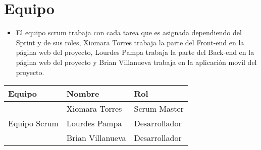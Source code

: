 \chapter{Equipo}
\begin{itemize}
	\item El equipo scrum trabaja con cada tarea que es asignada dependiendo del Sprint y de sus roles, Xiomara Torres trabaja la parte del Front-end en la página web del proyecto, Lourdes Pampa trabaja la parte del Back-end en la página web del proyecto y Brian Villanueva trabaja en la aplicación movil del proyecto.
\end{itemize}
\par
\begin{table}[htbp]
	\begin{center}
		\begin{tabular}{|l|l|l|}
			\hline
			\rowcolor{blue!40}   \textbf{Equipo} 
			&\textbf{Nombre}  & \textbf{Rol}   \\  \hline
			\multirow{3}{1cm}{Equipo Scrum} & Xiomara Torres & Scrum Master \\ \cline{2-2} & Lourdes Pampa & Desarrollador \\ \cline{2-2} & Brian Villanueva & Desarrollador \\ \hline
			
		\end{tabular}
	\end{center}
\end{table}